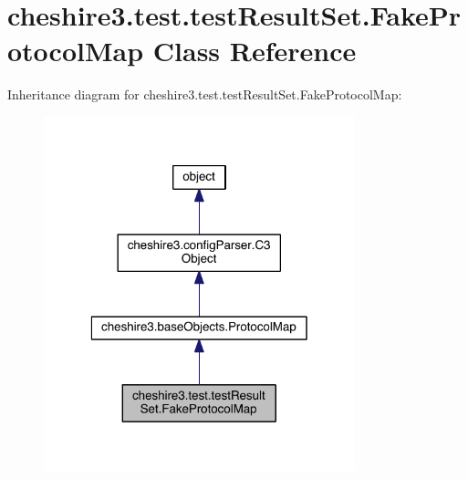 \hypertarget{classcheshire3_1_1test_1_1test_result_set_1_1_fake_protocol_map}{\section{cheshire3.\-test.\-test\-Result\-Set.\-Fake\-Protocol\-Map Class Reference}
\label{classcheshire3_1_1test_1_1test_result_set_1_1_fake_protocol_map}
}


Inheritance diagram for cheshire3.\-test.\-test\-Result\-Set.\-Fake\-Protocol\-Map\-:
\nopagebreak
\begin{figure}[H]
\begin{center}
\leavevmode
\includegraphics[width=256pt]{classcheshire3_1_1test_1_1test_result_set_1_1_fake_protocol_map__inherit__graph}
\end{center}
\end{figure}


